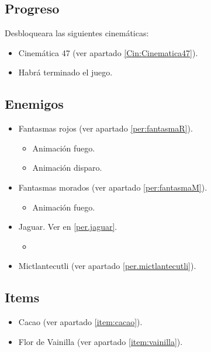 	\subsection{Progreso}
	Desbloqueara las siguientes cinemáticas:
\begin{itemize}
        \item Cinemática 47 (ver apartado \ref{Cin:Cinematica47}).
        \item Habrá terminado el juego.
\end{itemize}
	\subsection{Enemigos}
	\begin{itemize}
		\item Fantasmas rojos (ver apartado \ref{per:fantasmaR}).
		\begin{itemize}
				\item Animación fuego.
				\item Animación disparo.
		\end{itemize}
		\item Fantasmas morados (ver apartado \ref{per:fantasmaM}).
		\begin{itemize}
				\item Animación fuego.
		\end{itemize}
		\item Jaguar. Ver en \ref{per.jaguar}.
			\begin{itemize}
				\item 
			\end{itemize}
		\item Mictlantecutli (ver apartado \ref{per.mictlantecutli}).
	\end{itemize}
	\subsection{Items}
\begin{itemize}
        \item   Cacao (ver apartado \ref{item:cacao}).
        \item Flor de Vainilla (ver apartado \ref{item:vainilla}).
\end{itemize}

